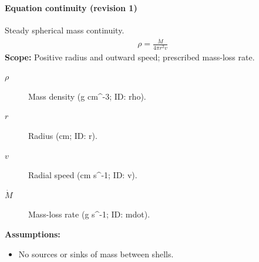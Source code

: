
\paragraph{Equation continuity (revision 1)}
Steady spherical mass continuity.
\begin{equation}
\begin{aligned}
\rho = \frac{\dot M}{4\pi r^2 v}
\end{aligned}
\label{eq:example.mass_5f_continuity:continuity:1}
\end{equation}
\noindent\textbf{Scope:} Positive radius and outward speed; prescribed mass-loss rate.

\begin{description}
\item[$\rho$] Mass density (g cm\textasciicircum{}-3; ID: rho).
\item[$r$] Radius (cm; ID: r).
\item[$v$] Radial speed (cm s\textasciicircum{}-1; ID: v).
\item[$\dot M$] Mass-loss rate (g s\textasciicircum{}-1; ID: mdot).
\end{description}

\noindent\textbf{Assumptions:}
\begin{itemize}
\item No sources or sinks of mass between shells.
\end{itemize}
